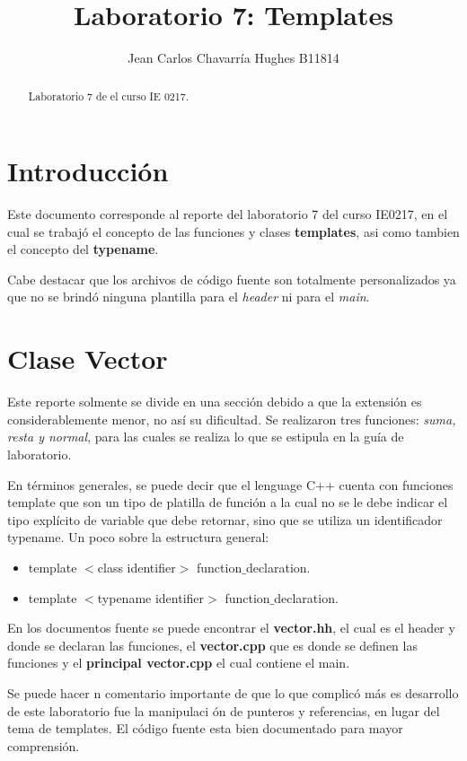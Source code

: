 \documentclass{article}
\begin{document}
\title{Laboratorio 7: Templates}
\author{Jean Carlos Chavarr\' ia Hughes B11814}
\maketitle
\begin{abstract}
Laboratorio 7 de el curso IE 0217.
\end{abstract}
\section{Introducci\' on}
Este documento corresponde al reporte del laboratorio 7 del curso IE0217, en el cual se trabaj\' o el concepto de las funciones y clases \textbf{templates}, asi como tambien el concepto del \textbf{typename}.

Cabe destacar que los archivos de c\' odigo fuente son totalmente personalizados ya que no se brind\' o ninguna plantilla para el \textit{header} ni para el \textit{main}.

\section{Clase Vector}
Este reporte solmente se divide en una secci\' on debido a que la extensi\' on es considerablemente menor, no as\' i su dificultad.
Se realizaron tres funciones: \textit{suma, resta y normal}, para las cuales se realiza lo que se estipula en la gu\' ia de laboratorio.

En t\' erminos generales, se puede decir que el lenguage C++ cuenta con funciones template que son un tipo de platilla de funci\' on a la cual no se le debe indicar el tipo expl\' icito de variable que debe retornar, sino que se utiliza un identificador typename.
Un poco sobre la estructura general:

\begin{itemize}
\item template $<$class identifier$>$ function$\_$declaration.
\item template $<$typename identifier$>$ function$\_$declaration.
\end{itemize}

En los documentos fuente se puede encontrar el \textbf{vector.hh}, el cual es el header y donde se declaran las funciones, el \textbf{vector.cpp} que es donde se definen las funciones y el \textbf{principal vector.cpp} el cual contiene el main.

Se puede hacer n comentario importante de que lo que complic\' o m\' as es desarrollo de este laboratorio fue la manipulaci \'on de punteros y referencias, en lugar del tema de templates. El c\' odigo fuente esta bien documentado para mayor comprensi\' on.
\end{document}
